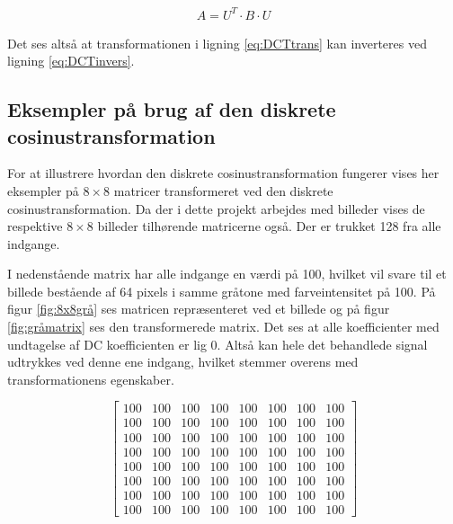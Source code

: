 \begin{align}
A=U^T \cdot B \cdot U
\label{eq:DCTinvers}
\end{align}

Det ses altså at transformationen i ligning \ref{eq:DCTtrans} kan inverteres ved ligning \ref{eq:DCTinvers}.

\subsection{Eksempler på brug af den diskrete cosinustransformation}
For at illustrere hvordan den diskrete cosinustransformation fungerer vises her eksempler på $8\times8$ matricer transformeret ved den diskrete cosinustransformation. Da der i dette projekt arbejdes med billeder vises de respektive $8\times8$ billeder tilhørende matricerne også. Der er trukket 128 fra alle indgange.

I nedenstående matrix har alle indgange en værdi på 100, hvilket vil svare til et billede bestående af 64 pixels i samme gråtone med farveintensitet på 100. På figur \ref{fig:8x8grå} ses matricen repræsenteret ved et billede og på figur \ref{fig:gråmatrix} ses den transformerede matrix. Det ses at alle koefficienter med undtagelse af DC koefficienten er lig 0. Altså kan hele det behandlede signal udtrykkes ved denne ene indgang, hvilket stemmer overens med transformationens egenskaber.

\[\begin{bmatrix}
100	&	100	&	100	&	100	&	100	&	100	&	100	&	100\\
100	&	100	&	100	&	100	&	100	&	100	&	100	&	100\\
100	&	100	&	100	&	100	&	100	&	100	&	100	&	100\\
100	&	100	&	100	&	100	&	100	&	100	&	100	&	100\\
100	&	100	&	100	&	100	&	100	&	100	&	100	&	100\\
100	&	100	&	100	&	100	&	100	&	100	&	100	&	100\\
100	&	100	&	100	&	100	&	100	&	100	&	100	&	100\\
100	&	100	&	100	&	100	&	100	&	100	&	100	&	100
\end{bmatrix}
\]

